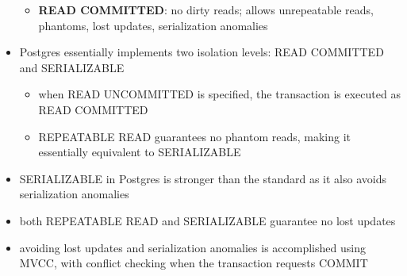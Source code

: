 \documentclass[8pt,landscape]{article}
\begin{document}
\begin{multicols*}{4}
\begin{itemize}[leftmargin=*]
\begin{itemize}[leftmargin=*]
    \item \textbf{READ COMMITTED}: no dirty reads; allows unrepeatable reads, phantoms, lost updates, serialization anomalies
\end{itemize}
    \item Postgres essentially implements two isolation levels: READ COMMITTED and SERIALIZABLE
    \begin{itemize}
        \item when READ UNCOMMITTED is specified, the transaction is executed as READ COMMITTED
        \item REPEATABLE READ guarantees no phantom reads, making it essentially equivalent to SERIALIZABLE
    \end{itemize}
    \item SERIALIZABLE in Postgres is stronger than the standard as it also avoids serialization anomalies
    \item both REPEATABLE READ and SERIALIZABLE guarantee no lost updates
    \item avoiding lost updates and serialization anomalies is accomplished using MVCC, with conflict checking when the transaction requests COMMIT
\end{itemize}
	\end{multicols*}
\end{document}
